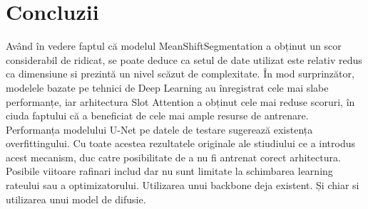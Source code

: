 \section{Concluzii}
Având în vedere faptul că modelul MeanShiftSegmentation a obținut un scor considerabil de ridicat, se poate deduce
ca setul de date utilizat este relativ redus ca dimensiune si prezintă un nivel scăzut de complexitate. În mod surprinzător, modelele bazate pe tehnici de Deep Learning au înregistrat cele mai
slabe performanțe, iar arhitectura Slot Attention a obținut cele mai reduse scoruri, în ciuda faptului că a beneficiat de cele mai ample resurse de antrenare.
Performanța modelului U-Net pe datele de testare sugerează existența overfittingului.
Cu toate acestea rezultatele originale ale stiudiului ce a introdus acest mecanism\cite{locatello2020object}, duc catre posibilitate de a nu fi antrenat corect arhitectura.
Posibile viitoare rafinari includ dar nu sunt limitate la schimbarea learning rateului sau a optimizatorului. Utilizarea unui backbone deja existent. Și chiar si utilizarea unui model de difusie.
